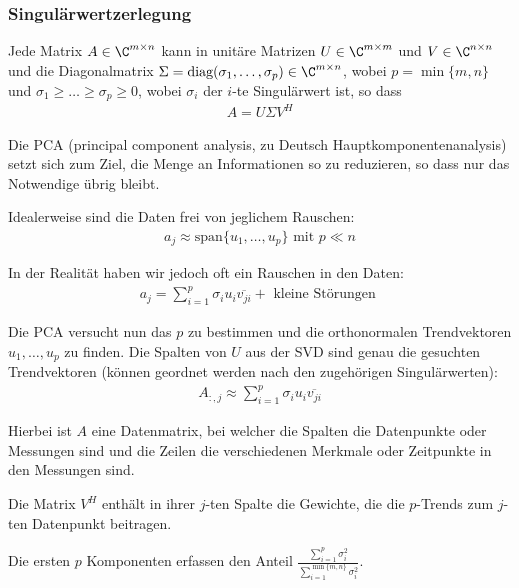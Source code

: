 \subsubsection{Singulärwertzerlegung}
\inlinetheorem Jede Matrix $A \in \C^{m \times n}$ kann in unitäre Matrizen $U \in \C^{m \times m}$ und $V \in \C^{n \times n}$ und die Diagonalmatrix
$\Sigma = \text{diag}(\sigma_1, \ldots, \sigma_p) \in \C^{m \times n}$, wobei $p = \min\{ m, n \}$ und $\sigma_1 \geq \ldots \geq \sigma_p \geq 0$,
wobei $\sigma_i$ der $i$-te Singulärwert ist, so dass
\rmvspace
\begin{align*}
    A = U\Sigma V^H
\end{align*}

Die PCA (principal component analysis, zu Deutsch Hauptkomponentenanalysis) setzt sich zum Ziel, die Menge an Informationen so zu reduzieren, so dass nur das Notwendige übrig bleibt.

Idealerweise sind die Daten frei von jeglichem Rauschen:
\rmvspace
\begin{align*}
    a_j \approx \text{span}\{ u_1, \ldots, u_p \} \text{ mit } p \ll n
\end{align*}

\drmvspace
In der Realität haben wir jedoch oft ein Rauschen in den Daten:
\rmvspace
\begin{align*}
    a_j = \sum_{i = 1}^{p} \sigma_i u_i \overline{v_{ji}} + \text{ kleine Störungen }
\end{align*}

\drmvspace
Die PCA versucht nun das $p$ zu bestimmen und die orthonormalen Trendvektoren $u_1, \ldots, u_p$ zu finden.
Die Spalten von $U$ aus der SVD sind genau die gesuchten Trendvektoren (können geordnet werden nach den zugehörigen Singulärwerten):
\rmvspace
\begin{align*}
    A_{:, j} \approx \sum_{i = 1}^{p} \sigma_i u_i \overline{v_{ji}}
\end{align*}

\drmvspace
Hierbei ist $A$ eine Datenmatrix, bei welcher die Spalten die Datenpunkte oder Messungen sind und die Zeilen die verschiedenen Merkmale oder Zeitpunkte in den Messungen sind.

Die Matrix $V^H$ enthält in ihrer $j$-ten Spalte die Gewichte, die die $p$-Trends zum $j$-ten Datenpunkt beitragen.

Die ersten $p$ Komponenten erfassen den Anteil $\displaystyle \frac{\sum_{i = 1}^{p} \sigma_i^2}{\sum_{i = 1}^{\min\{m, n\}} \sigma_i^2}$.


